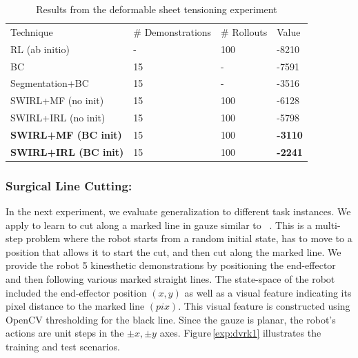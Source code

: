 \begin{table}[ht]
\centering
\scriptsize
\caption{Results from the deformable sheet tensioning experiment}
\label{my-label}
\begin{tabular}{llll}
\rowcolor[HTML]{000000} 
{\color[HTML]{FFFFFF} Technique} & {\color[HTML]{FFFFFF} \# Demonstrations} & {\color[HTML]{FFFFFF} \# Rollouts} & {\color[HTML]{FFFFFF} Value} \\
RL (ab initio)                   & -                                        & 100                                & -8210                        \\
BC                               & 15                                       & -                                  & -7591                        \\
Segmentation+BC                  & 15                                       & -                                  & -3516                        \\
SWIRL+MF (no init)                  & 15                                       & 100                                & -6128                        \\
SWIRL+IRL (no init)                  & 15                                       & 100                                & -5798                        \\
\textbf{SWIRL+MF (BC init)}                  & 15                                       & 100                                & \textbf{-3110}     \\
\textbf{SWIRL+IRL (BC init)}                  & 15                                       & 100                                & \textbf{-2241}                       
\end{tabular}
\end{table}


\subsubsection{Surgical Line Cutting: }
In the next experiment, we evaluate generalization to different task instances.
We apply \hirl to learn to cut along a marked line in gauze similar to ~\cite{murali2015learning}.
This is a multi-step problem where the robot starts from a random initial state, has to move to a position that allows it to start the cut, and then cut along the marked line.
We provide the robot 5 kinesthetic demonstrations by positioning the end-effector and then following various marked straight lines.
The state-space of the robot included the end-effector position $(x,y)$ as well as a visual feature indicating its pixel distance to the marked line $(pix)$.
This visual feature is constructed using OpenCV thresholding for the black line.
Since the gauze is planar, the robot's actions are unit steps in the $\pm x, \pm y$ axes.
Figure\,\ref{exp:dvrk1} illustrates the training and test scenarios.

